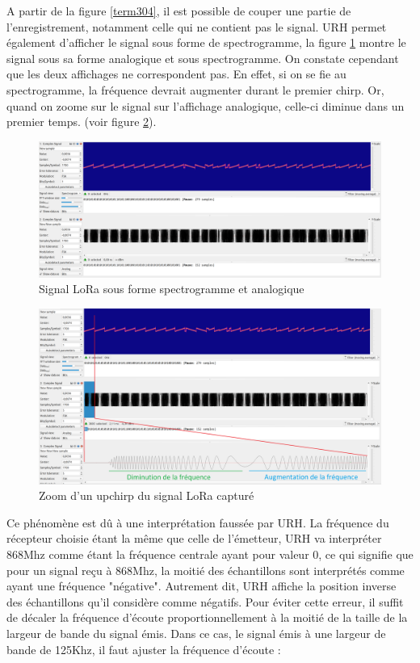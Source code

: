 A partir de la figure \ref{term304}, il est possible de couper une partie de l'enregistrement, notamment celle qui ne contient pas le signal. \ac{URH} permet également d'afficher le signal sous forme de spectrogramme, la figure \ref{term306} montre le signal sous sa forme analogique et sous spectrogramme. On constate cependant que les deux affichages ne correspondent pas. En effet, si on se fie au spectrogramme, la fréquence devrait augmenter durant le premier chirp. Or, quand on zoome sur le signal sur l'affichage analogique, celle-ci diminue dans un premier temps. (voir figure \ref{term307}).

\newpage

\begin{figure}[h]
\centering

\includegraphics[scale=0.11]{images/urh4.png}
\caption{Signal LoRa sous forme spectrogramme et analogique}\label{term306}
\end{figure}

\begin{figure}[h]
\centering

\includegraphics[scale=0.18]{images/urh5.png}
\caption{Zoom d'un upchirp du signal LoRa capturé}\label{term307}
\end{figure}

Ce phénomène est dû à une interprétation faussée par \ac{URH}. La fréquence du récepteur choisie étant la même que celle de l'émetteur, \ac{URH} va interpréter 868Mhz comme étant la fréquence centrale ayant pour valeur 0, ce qui signifie que pour un signal reçu à 868Mhz, la moitié des échantillons sont interprétés comme ayant une fréquence "négative". Autrement dit, \ac{URH} affiche la position inverse des échantillons qu'il considère comme négatifs. Pour éviter cette erreur, il suffit de décaler la fréquence d'écoute proportionnellement à la moitié de la taille de la largeur de bande du signal émis. Dans ce cas, le signal émis à une largeur de bande de 125Khz, il faut ajuster la fréquence d'écoute :

